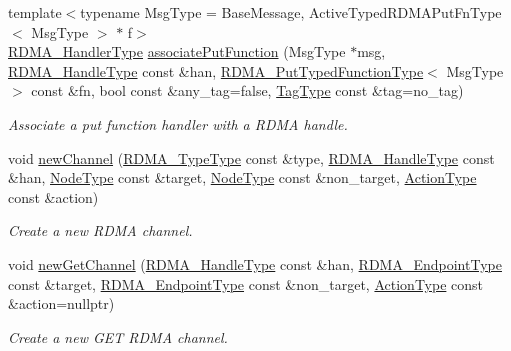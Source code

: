 \begin{DoxyCompactItemize}
{\footnotesize template$<$typename Msg\+Type  = Base\+Message, Active\+Typed\+R\+D\+M\+A\+Put\+Fn\+Type$<$ Msg\+Type $>$ $\ast$ f$>$ }\\\hyperlink{namespacevt_a9530efb893c0f3846e8ac5f0507e0f49}{R\+D\+M\+A\+\_\+\+Handler\+Type} \hyperlink{structvt_1_1rdma_1_1_r_d_m_a_manager_a5092afb73c1a6fb69cb211f23eb704cb}{associate\+Put\+Function} (Msg\+Type $\ast$msg, \hyperlink{namespacevt_a10442579ec4e7ebef223818e64bcf908}{R\+D\+M\+A\+\_\+\+Handle\+Type} const \&han, \hyperlink{structvt_1_1rdma_1_1_r_d_m_a_manager_ad9746ec3367968e16945ef88c1ac45ce}{R\+D\+M\+A\+\_\+\+Put\+Typed\+Function\+Type}$<$ Msg\+Type $>$ const \&fn, bool const \&any\+\_\+tag=false, \hyperlink{namespacevt_a84ab281dae04a52a4b243d6bf62d0e52}{Tag\+Type} const \&tag=no\+\_\+tag)
\begin{DoxyCompactList}\small\item\em Associate a put function handler with a R\+D\+MA handle. \end{DoxyCompactList}\item 
void \hyperlink{structvt_1_1rdma_1_1_r_d_m_a_manager_add2a57acf8b38758b2e53f71d92d452a}{new\+Channel} (\hyperlink{namespacevt_1_1rdma_ac848e1d9da43db6294bd06f83e5d3946}{R\+D\+M\+A\+\_\+\+Type\+Type} const \&type, \hyperlink{namespacevt_a10442579ec4e7ebef223818e64bcf908}{R\+D\+M\+A\+\_\+\+Handle\+Type} const \&han, \hyperlink{namespacevt_a866da9d0efc19c0a1ce79e9e492f47e2}{Node\+Type} const \&target, \hyperlink{namespacevt_a866da9d0efc19c0a1ce79e9e492f47e2}{Node\+Type} const \&non\+\_\+target, \hyperlink{namespacevt_ae0a5a7b18cc99d7b732cb4d44f46b0f3}{Action\+Type} const \&action)
\begin{DoxyCompactList}\small\item\em Create a new R\+D\+MA channel. \end{DoxyCompactList}\item 
void \hyperlink{structvt_1_1rdma_1_1_r_d_m_a_manager_af300aa329bab5b4fe851025525659454}{new\+Get\+Channel} (\hyperlink{namespacevt_a10442579ec4e7ebef223818e64bcf908}{R\+D\+M\+A\+\_\+\+Handle\+Type} const \&han, \hyperlink{structvt_1_1rdma_1_1_r_d_m_a_manager_a106350721a187d2cfb94a9017ef66a07}{R\+D\+M\+A\+\_\+\+Endpoint\+Type} const \&target, \hyperlink{structvt_1_1rdma_1_1_r_d_m_a_manager_a106350721a187d2cfb94a9017ef66a07}{R\+D\+M\+A\+\_\+\+Endpoint\+Type} const \&non\+\_\+target, \hyperlink{namespacevt_ae0a5a7b18cc99d7b732cb4d44f46b0f3}{Action\+Type} const \&action=nullptr)
\begin{DoxyCompactList}\small\item\em Create a new G\+ET R\+D\+MA channel. \end{DoxyCompactList}\item 

\end{DoxyCompactItemize}
